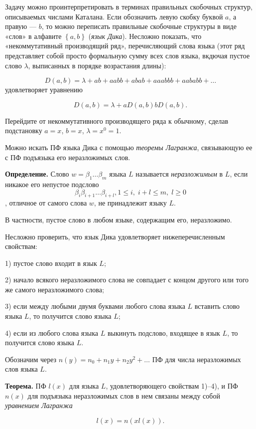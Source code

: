 \begin{ordre}
Задачу можно проинтерпретировать в терминах правильных скобочных структур, описываемых числами Каталана. Если обозначить левую скобку буквой $a$, а правую --- $b$, то можно переписать правильные скобочные структуры в виде «слов» в алфавите $\left\{a,b\right\}$ (\textit{язык Дика}). Несложно показать, что «некоммутативный производящий ряд», перечисляющий слова языка (этот ряд представляет собой просто формальную сумму всех слов языка, вкдючая пустое слово $\lambda$, выписанных в порядке возрастания длины):

\[D(a,b)=\lambda +ab+aabb+abab+aaabbb+aababb+\ldots \] 
удовлетворяет уравнению

\[D(a,b)=\lambda +aD(a,b)bD(a,b).\] 

Перейдите от некоммутативного производящего ряда к обычному, сделав подстановку $a=x$, $b=x$, $\lambda =x^{0} =1$.

Можно искать ПФ языка Дика с помощью \textit{теоремы Лагранжа}, связывающую ее с ПФ подъязыка его неразложимых слов.

\textbf{Определение. }Слово $w=\beta _{1} \ldots \beta _{m} $ языка $L$ называется \textit{неразложимым} в $L$, если никакое его непустое подслово 
$$\beta _{i}\beta _{i+1}\dots \beta _{i+l} , 1\le i,\; i+l\le m,\; l\ge 0$$, отличное от самого слова $w$, не принадлежит языку $L$.

В частности, пустое слово в любом языке, содержащим его, неразложимо.

Несложно проверить, что язык Дика удовлетворяет нижеперечисленным свойствам:

1) пустое слово входит в язык $L$;

2) начало всякого неразложимого слова не совпадает с концом другого или того же самого неразложимого слова;

3) если между любыми двумя буквами любого слова языка $L$ вставить слово языка $L$, то получится слово языка $L$;

4) если из любого слова языка $L$ выкинуть подслово, входящее в язык $L$, то получится слово языка $L$.

Обозначим через $n(y)=n_{0} +n_{1} y+n_{2} y^{2} +\ldots $ ПФ для числа неразложимых слов языка $L$.

\textbf{Теорема.} ПФ $l(x)$ для языка $L$, удовлетворяющего свойствам 1)--4), и ПФ $n(x)$ для подъязыка неразложимых слов в нем связаны между собой \textit{уравнением Лагранжа}

$$l(x)=n\left(xl(x)\right).$$


\end{ordre}

